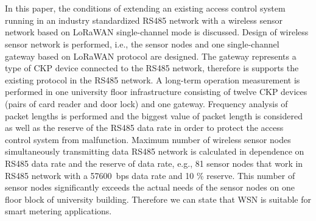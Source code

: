 \DIFdelbegin \section{}
\addtocounter{section}{-1}%
\DIFdelend \DIFaddbegin \chapter{}
\DIFaddend 

In this paper, the conditions of extending an existing access control system running in an industry standardized RS485 network with a wireless sensor network based on LoRaWAN single-channel mode is discussed. 
Design of wireless sensor network is performed, i.e., the sensor nodes and one single-channel gateway based on LoRaWAN protocol are designed. The gateway represents a type of CKP device connected to the RS485 network, therefore is supports the existing protocol in the RS485 network. A long-term operation measurement is performed in one university floor infrastructure consisting of twelve CKP devices (pairs of card reader and door lock) and one gateway. Frequency analysis of packet lengths is performed and the biggest value of packet length is considered as well as the reserve of the RS485 data rate in order to protect the access control system from malfunction. 
Maximum number of wireless sensor nodes simultaneously transmitting data RS485 network is calculated in dependence on RS485 data rate and the reserve of data rate, e.g., 81 sensor nodes that work in RS485 network with a 57600~bps data rate and 10 \% reserve. This number of sensor nodes significantly exceeds the actual needs of the sensor nodes on one floor block of university building. Therefore we can state that WSN is suitable for smart metering applications.

